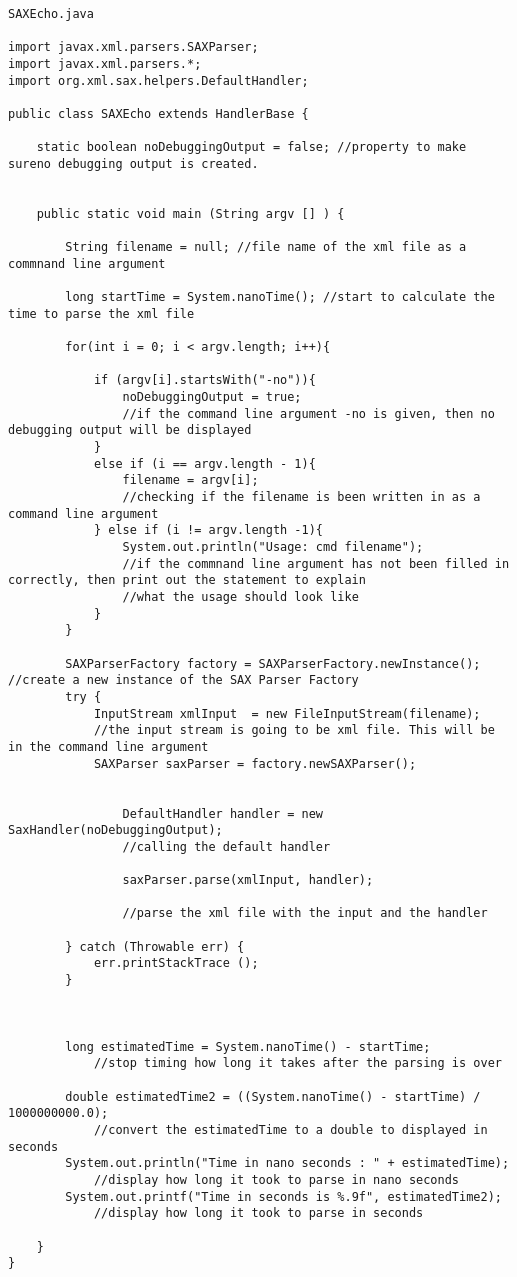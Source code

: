 \documentclass[11pt,english]{article}
\begin{document}
\begin{lstlisting}
SAXEcho.java

import javax.xml.parsers.SAXParser;
import javax.xml.parsers.*;
import org.xml.sax.helpers.DefaultHandler;

public class SAXEcho extends HandlerBase {

	static boolean noDebuggingOutput = false; //property to make sureno debugging output is created.


	public static void main (String argv [] ) {

		String filename = null; //file name of the xml file as a commnand line argument

		long startTime = System.nanoTime(); //start to calculate the time to parse the xml file

		for(int i = 0; i < argv.length; i++){

			if (argv[i].startsWith("-no")){
				noDebuggingOutput = true; 
				//if the command line argument -no is given, then no debugging output will be displayed
			}
			else if (i == argv.length - 1){ 
				filename = argv[i];
				//checking if the filename is been written in as a command line argument 
			} else if (i != argv.length -1){
				System.out.println("Usage: cmd filename");
				//if the commnand line argument has not been filled in correctly, then print out the statement to explain
				//what the usage should look like
			}
		}

		SAXParserFactory factory = SAXParserFactory.newInstance(); //create a new instance of the SAX Parser Factory
		try {		
			InputStream xmlInput  = new FileInputStream(filename); 
			//the input stream is going to be xml file. This will be in the command line argument
			SAXParser saxParser = factory.newSAXParser();


				DefaultHandler handler = new SaxHandler(noDebuggingOutput);
				//calling the default handler

				saxParser.parse(xmlInput, handler);

				//parse the xml file with the input and the handler

		} catch (Throwable err) {
			err.printStackTrace ();
		}



		long estimatedTime = System.nanoTime() - startTime;
            //stop timing how long it takes after the parsing is over

		double estimatedTime2 = ((System.nanoTime() - startTime) / 1000000000.0);
            //convert the estimatedTime to a double to displayed in seconds
		System.out.println("Time in nano seconds : " + estimatedTime);
            //display how long it took to parse in nano seconds
		System.out.printf("Time in seconds is %.9f", estimatedTime2);
            //display how long it took to parse in seconds

	}
}



\end{lstlisting}
\end{document}
